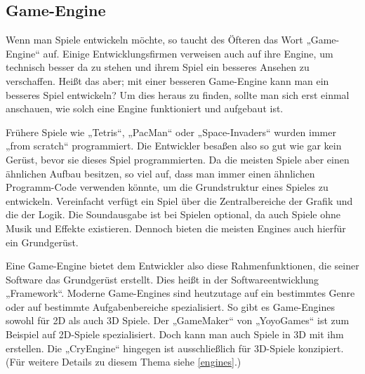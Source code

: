 \subsection{Game-Engine}	
\label{engine}
Wenn man Spiele entwickeln möchte, so taucht des Öfteren das Wort „Game-Engine“ auf. Einige Entwicklungsfirmen verweisen auch auf ihre Engine, um technisch besser da zu stehen und ihrem Spiel ein besseres Ansehen zu verschaffen. Heißt das aber; mit einer besseren Game-Engine kann man ein besseres Spiel entwickeln? Um dies heraus zu finden, sollte man sich erst einmal anschauen, wie solch eine Engine funktioniert und aufgebaut ist.

Frühere Spiele wie „Tetris“, „PacMan“ oder „Space-Invaders“ wurden immer „from scratch“  programmiert. Die Entwickler besaßen also so gut wie gar kein Gerüst, bevor sie dieses Spiel programmierten. Da die meisten Spiele aber einen ähnlichen Aufbau besitzen, so viel auf, dass man immer einen ähnlichen Programm-Code verwenden könnte, um die Grundstruktur eines Spieles zu entwickeln. Vereinfacht verfügt ein Spiel über die Zentralbereiche der Grafik und die der Logik. Die Soundausgabe ist bei Spielen optional, da auch Spiele ohne Musik und Effekte existieren. Dennoch bieten die meisten Engines auch hierfür ein Grundgerüst.

Eine Game-Engine bietet dem Entwickler also diese Rahmenfunktionen, die seiner Software das Grundgerüst erstellt. Dies heißt in der Softwareentwicklung „Framework“. 
Moderne Game-Engines sind heutzutage auf ein bestimmtes Genre oder auf bestimmte Aufgabenbereiche spezialisiert. So gibt es Game-Engines sowohl für 2D als auch 3D Spiele. Der „GameMaker“ von „YoyoGames“ ist zum Beispiel auf 2D-Spiele spezialisiert. Doch kann man auch Spiele in 3D mit ihm erstellen. Die „CryEngine“ hingegen ist ausschließlich für 3D-Spiele konzipiert. (Für weitere Details zu diesem Thema siehe \ref{engines}.)
